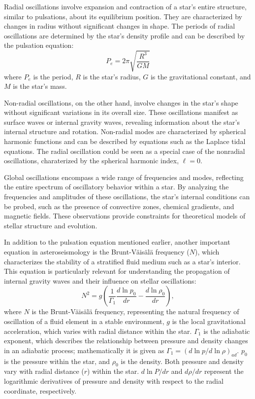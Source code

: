 \documentclass{article}
\begin{document}
Radial oscillations involve expansion and contraction of a star's entire structure, similar to pulsations, about its equilibrium position. They are characterized by changes in radius without significant changes in shape. The periods of radial oscillations are determined by the star's density profile and can be described by the pulsation equation:
\begin{equation}
P_{e} = 2\pi \sqrt{\frac{R^3}{GM}}
\end{equation}
where $P_{e}$ is the period, \(R\) is the star's radius, \(G\) is the gravitational constant, and \(M\) is the star's mass.

Non-radial oscillations, on the other hand, involve changes in the star's shape without significant variations in its overall size. These oscillations manifest as surface waves or internal gravity waves, revealing information about the star's internal structure and rotation. Non-radial modes are characterized by spherical harmonic functions and can be described by equations such as the Laplace tidal equations. The radial oscillation could be seen as a special case of the nonradial oscillations, charaterized by the spherical harmonic index, $\ell = 0$.

Global oscillations encompass a wide range of frequencies and modes, reflecting the entire spectrum of oscillatory behavior within a star. By analyzing the frequencies and amplitudes of these oscillations, the star's internal conditions can be probed, such as the presence of convective zones, chemical gradients, and magnetic fields. These observations provide constraints for theoretical models of stellar structure and evolution.

In addition to the pulsation equation mentioned earlier, another important equation in asteroseismology is the Brunt-Väisälä frequency (\(N\)), which characterizes the stability of a stratified fluid medium such as a star's interior. This equation is particularly relevant for understanding the propagation of internal gravity waves and their influence on stellar oscillations\cite{unno1989nonradial}:
\begin{equation}
    N^{2} = g \left( \frac{1}{\Gamma_1} \frac{d\ln p_{0}}{dr} - \frac{d\ln\rho_{0}}{dr} \right),
\end{equation}
where \(N\) is the Brunt-Väisälä frequency, representing the natural frequency of oscillation of a fluid element in a stable environment, \(g\) is the local gravitational acceleration, which varies with radial distance within the star. \(\Gamma_1\) is the adiabatic exponent, which describes the relationship between pressure and density changes in an adiabatic process; mathematically it is given as $\Gamma_{1} = (d\ln p/d\ln \rho)_{ad}$. $p_{0}$ is the pressure within the star, and $\rho_{0}$ is the density. Both pressure and density vary with radial distance (\(r\)) within the star. \(d\ln P/dr\) and \(d\rho/dr\) represent the logarithmic derivatives of pressure and density with respect to the radial coordinate, respectively.
\end{document}
